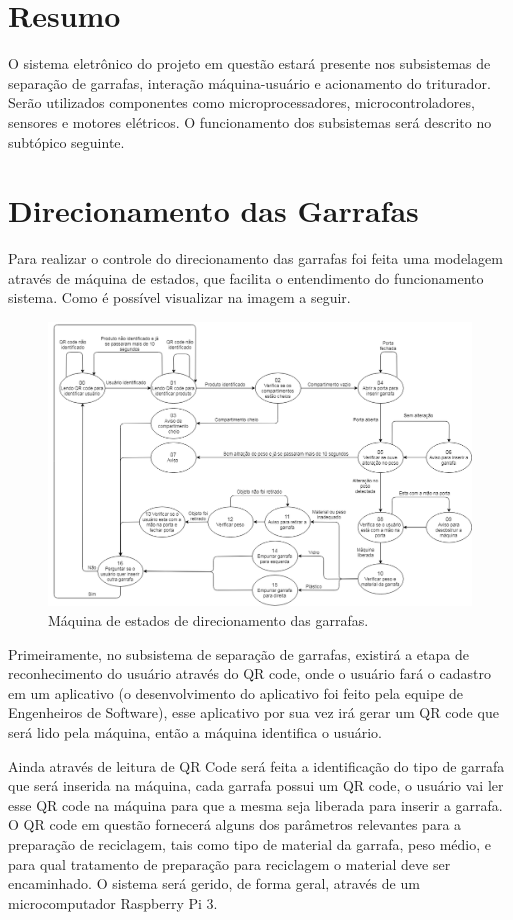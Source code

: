 \section{Resumo}
O sistema eletrônico do projeto em questão estará presente nos subsistemas de separação de garrafas, interação máquina-usuário e acionamento do triturador. Serão utilizados componentes como microprocessadores, microcontroladores, sensores e motores elétricos. O funcionamento dos subsistemas será descrito no subtópico seguinte.

\section{Direcionamento das Garrafas}
Para realizar o controle do direcionamento das garrafas foi feita uma modelagem através de máquina de estados, que facilita o entendimento do funcionamento sistema. Como é possível visualizar na imagem a seguir.

\begin{figure}[!ht]
	\centering
		\includegraphics[scale=0.4]{figuras/eletronica/1-Maquina-de-estados.png}
	\caption{Máquina de estados de direcionamento das garrafas.}
\end{figure}

Primeiramente, no subsistema de separação de garrafas, existirá a etapa de reconhecimento do usuário através do QR code, onde o usuário fará o cadastro em um aplicativo (o desenvolvimento do aplicativo foi feito pela equipe de Engenheiros de Software), esse aplicativo por sua vez irá gerar um QR code que será lido pela máquina, então a máquina identifica o usuário. 

Ainda através de leitura de QR Code será feita a identificação do tipo de garrafa que será inserida na máquina, cada garrafa possui um QR code, o usuário vai ler esse QR code na máquina para que a mesma seja liberada para inserir a garrafa. O QR code em questão fornecerá alguns dos parâmetros relevantes para a preparação de reciclagem, tais como tipo de material da garrafa, peso médio, e para qual tratamento de preparação para reciclagem o material deve ser encaminhado. O sistema será gerido, de forma geral, através de um microcomputador Raspberry Pi 3.
 
